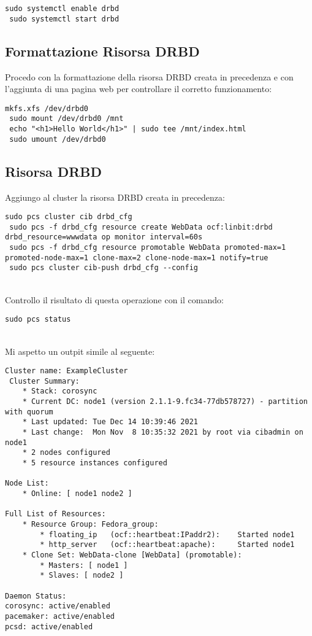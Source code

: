 \begin{lstlisting}[style=cmd]
 sudo systemctl enable drbd
 sudo systemctl start drbd
\end{lstlisting}

\subsection{Formattazione Risorsa DRBD}

Procedo con la formattazione della risorsa DRBD creata in precedenza e con l'aggiunta di una pagina web per controllare il corretto funzionamento:

\begin{lstlisting}[style=cmd]
 mkfs.xfs /dev/drbd0
 sudo mount /dev/drbd0 /mnt
 echo "<h1>Hello World</h1>" | sudo tee /mnt/index.html
 sudo umount /dev/drbd0
\end{lstlisting}

\subsection{Risorsa DRBD}

Aggiungo al cluster la risorsa DRBD creata in precedenza:

\begin{lstlisting}[style=cmd]
 sudo pcs cluster cib drbd_cfg
 sudo pcs -f drbd_cfg resource create WebData ocf:linbit:drbd drbd_resource=wwwdata op monitor interval=60s
 sudo pcs -f drbd_cfg resource promotable WebData promoted-max=1 promoted-node-max=1 clone-max=2 clone-node-max=1 notify=true
 sudo pcs cluster cib-push drbd_cfg --config
\end{lstlisting}
\ \\
Controllo il risultato di questa operazione con il comando:

\begin{lstlisting}[style=cmd]
 sudo pcs status
\end{lstlisting}
\ \\
Mi aspetto un outpit simile al seguente:

\begin{lstlisting}[style=output]
 Cluster name: ExampleCluster
 Cluster Summary:
    * Stack: corosync
    * Current DC: node1 (version 2.1.1-9.fc34-77db578727) - partition with quorum
    * Last updated: Tue Dec 14 10:39:46 2021
    * Last change:  Mon Nov  8 10:35:32 2021 by root via cibadmin on node1
    * 2 nodes configured
    * 5 resource instances configured

Node List:
    * Online: [ node1 node2 ]

Full List of Resources:
    * Resource Group: Fedora_group:
        * floating_ip	(ocf::heartbeat:IPaddr2):	 Started node1
        * http_server	(ocf::heartbeat:apache):	 Started node1
    * Clone Set: WebData-clone [WebData] (promotable):
        * Masters: [ node1 ]
        * Slaves: [ node2 ]

Daemon Status:
corosync: active/enabled
pacemaker: active/enabled
pcsd: active/enabled

\end{lstlisting}

